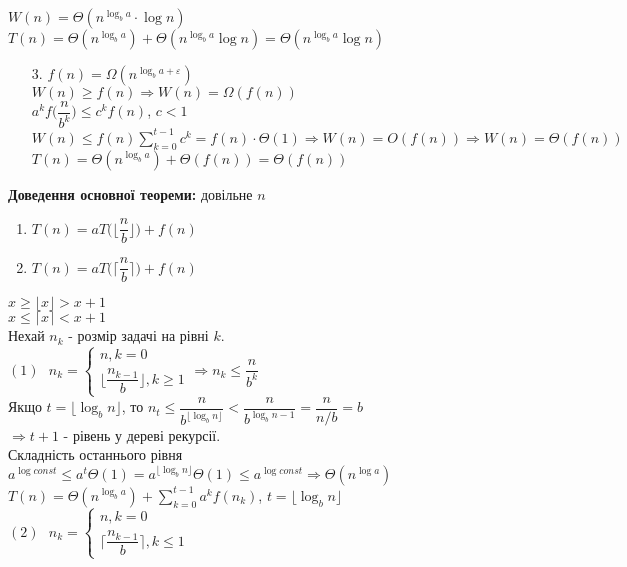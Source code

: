 \documentclass[a4paper,12pt]{article}
\newcommand{\dsum}{\displaystyle\sum}
\begin{document}
\newpage
    $W(n)=\Theta(n^{\log_ba}\cdot \log n)$ \\
    $T(n)=\Theta(n^{\log_ba})+\Theta(n^{\log_ba}\log n)=\Theta(n^{\log_ba}\log n)$
    \begin{enumerate}
        \item[3.] $f(n)=\Omega(n^{\log_ba+\varepsilon})$ \\
        $W(n)\geqslant f(n)\Rightarrow W(n)=\Omega(f(n))$ \\
        $a^kf\Biggl(\dfrac{n}{b^k}\Biggr)\leqslant c^kf(n)$, $c<1$ \\
        $W(n)\leqslant f(n)\dsum\limits_{k=0}^{t-1}c^k=f(n)\cdot\Theta(1)\Rightarrow W(n)=O(f(n))\Rightarrow W(n)=\Theta(f(n))$ \\
        $T(n)=\Theta(n^{\log_ba})+\Theta(f(n))=\Theta(f(n))$
    \end{enumerate}
    \textbf{Доведення основної теореми:} довільне $n$ \\
    \begin{enumerate}
        \item $T(n)=aT\Biggl(\bigg\lfloor\dfrac{n}{b}\bigg\rfloor\Biggr)+f(n)$
        \item $T(n)=aT\Biggl(\bigg\lceil\dfrac{n}{b}\bigg\rceil\Biggr)+f(n)$
    \end{enumerate}
    $x\geqslant\lfloor x\rfloor>x+1$ \\
    $x\leqslant \lceil x\rceil<x+1$ \\
    Нехай $n_k$ - розмір задачі на рівні $k$. \\
    $(1)\:\:\:n_k=\begin{cases}
        n, k=0 \\
        \bigg\lfloor\dfrac{n_{k-1}}{b}\bigg\rfloor, k\geqslant 1
    \end{cases} \Rightarrow n_k\leqslant\dfrac{n}{b^k}$ \\
    Якщо $t=\lfloor\log_bn\rfloor$, то $n_t\leqslant\dfrac{n}{b^{\lfloor\log_bn\rfloor}}<\dfrac{n}{b^{\log_bn-1}}=\dfrac{n}{n/b}=b$ \\
    $\Rightarrow t+1$ - рівень у дереві рекурсії. \\
    Складність останнього рівня $a^{\log const}\leqslant a^t\Theta(1)=a^{\lfloor\log_bn\rfloor}\Theta(1)\leqslant a^{\log const} \Rightarrow \Theta(n^{\log a})$ \\
    $T(n)=\Theta(n^{\log_ba})+\dsum\limits_{k=0}^{t-1}a^kf(n_k)$, $t=\lfloor\log_bn\rfloor$ \\
    $(2)\:\:\: n_k=\begin{cases}
        n, k=0 \\
        \bigg\lceil\dfrac{n_{k-1}}{b}\bigg\rceil, k\leqslant 1
    \end{cases}$ \\
\end{document}
